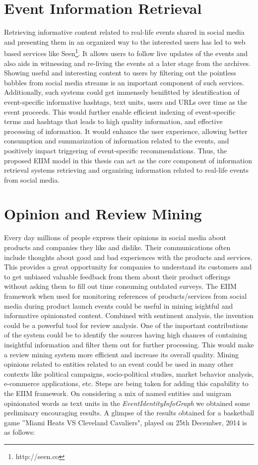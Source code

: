\section{Event Information Retrieval}
Retrieving informative content related to real-life events shared in social media and presenting them in an organized way to the interested users has led to web based services like Seen\footnote{http://seen.co}. It allows users to follow live updates of the events and also aids in witnessing and re-living the events at a later stage from the archives. Showing useful and interesting content to users by filtering out the pointless babbles from social media streams is an important component of such services. Additionally, such systems could get immensely benifitted by identification of event-specific informative hashtags, text units, users and URLs over time as the event proceeds. This would further enable efficient indexing of event-specific terms and hashtags that leads to high quality information, and effective processing of information. It would enhance the user experience, allowing better consumption and summarization of information related to the events, and positively impact triggering of event-specific recommendations. Thus, the proposed EIIM model in this thesis can act as the core component of information retrieval systems retrieving and organizing information related to real-life events from social media. 

\section{Opinion and Review Mining}
Every day millions of people express their opinions in social media about products and companies they like and dislike. Their communications often include thoughts about good and bad experiences with the products and services. This provides a great opportunity for companies to understand its customers and to get unbiased valuable feedback from them about their product offerings without asking them to fill out time consuming outdated surveys. The EIIM framework when used for monitoring references of products/services from social media during product launch events could be useful in mining isightful and informative opinionated content. Combined with sentiment analysis, the invention could be a powerful tool for review analysis. One of the important contributions of the system could be to identify the sources having high chances of containing insightful information and filter them out for further processing. This would make a review mining system more efficient and increase its overall quality. Mining opinions related to entities related to an event could be used in many other contexts like political campaigns, socio-political studies, market behavior analysis, e-commerce applications, etc. Steps are being taken for adding this capability to the EIIM framework. On considering a mix of named entities and unigram opinionated words as text units in the \textit{EventIdentityInfoGraph} we obtained some preliminary encouraging results. A glimpse of the results obtained for a basketball game ''Miami Heats VS Cleveland Cavaliers", played on 25th December, 2014 is as follows:

